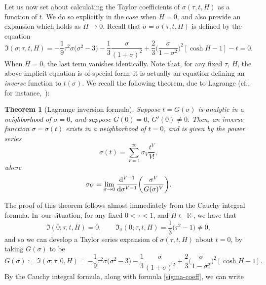 \documentclass[pdftex]{sigma}
\DeclareMathOperator{\RR}{\mathbb{R}}
\numberwithin{equation}{section}
\newtheorem{Theorem}{Theorem}[section]
\begin{document}
Let us now set about calculating the Taylor coefficients of $\sigma(\tau,t,H)$ as a function of $t$. We do so explicitly in the case when
$H=0$, and also provide an expansion which holds as $H\to 0$. Recall that $\sigma = \sigma(\tau,t,H)$ is defined by the equation
 \begin{equation*}
 \mathfrak{I}(\sigma;\tau,t,H) = -\frac{1}{9}\tau^2\sigma \bigl(\sigma^2 - 3\bigr) -\frac{1}{3}\frac{\sigma}{(1+\sigma)^2} + \frac{2}{3}\biggl(\frac{\sigma}{1-\sigma^2}\biggr)^2[\cosh H -1] - t = 0.
 \end{equation*}
When $H=0$, the last term vanishes identically. Note that, for any fixed $\tau$, $H$, the above implicit equation is of special form: it
is actually an equation defining an \textit{inverse} function to $t(\sigma)$.
We recall the following theorem, due to Lagrange (cf., for instance,~\cite[p.~149, Exercise~25]{WW}):
 \begin{Theorem}[Lagrange inversion formula]
 Suppose $t = G(\sigma)$ is analytic in a neighborhood of $\sigma= 0$, and suppose $G(0) = 0$, $G'(0) \neq 0$. Then, an inverse function $\sigma = \sigma(t)$ exists in a neighborhood of $t = 0$, and is given by the power series
 \begin{equation*}
 \sigma(t) = \sum_{V=1}^{\infty} \sigma_V \frac{t^V}{V!},
 \end{equation*}
 where
 \begin{equation}\label{sigma-coeff}
 \sigma_V = \lim_{\sigma\to 0}\frac{{\rm d}^{V-1}}{{\rm d}\sigma^{V-1}} \biggl(\frac{\sigma^V}{G(\sigma)^V}\biggr).
 \end{equation}
 \end{Theorem}
The proof of this theorem follows almost immediately from the Cauchy integral formula. In~our situation, for any fixed $0<\tau<1$,
and $H\in \RR$, we have that
 \begin{equation*}
 \mathfrak{I}(0;\tau,t,H) = 0,\qquad \mathfrak{I}_\sigma(0;\tau,t,H) = \frac{1}{3}\bigl(\tau^2-1\bigr) \neq 0,
 \end{equation*}
and so we can develop a Taylor series expansion of $\sigma(\tau,t,H)$ about $t=0$, by taking $G(\sigma)$ to be
 \begin{equation*}
 G(\sigma) := \mathfrak{I}(\sigma;\tau,0,H) = -\frac{1}{9}\tau^2\sigma \bigl(\sigma^2 - 3\bigr) -\frac{1}{3}\frac{\sigma}{(1+\sigma)^2} + \frac{2}{3}\biggl(\frac{\sigma}{1-\sigma^2}\biggr)^2[\cosh H -1].
 \end{equation*}
By the Cauchy integral formula, along with formula \eqref{sigma-coeff}, we can write
\end{document}
